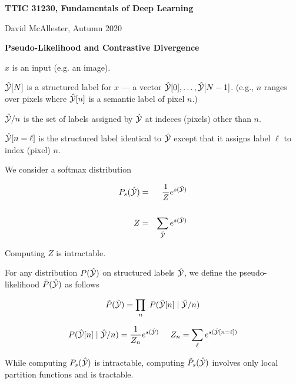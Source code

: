 




{\Huge

  \centerline{\bf TTIC 31230, Fundamentals of Deep Learning}
  \bigskip
  \centerline{David McAllester, Autumn 2020}
  \vfill
  \vfill
  \centerline{\bf Pseudo-Likelihood and Contrastive Divergence}
\vfill
\vfill
\vfill


$x$ is an input (e.g. an image).

\vfill
$\hat{\cal Y} [N]$ is a structured label for $x$ --- a vector $\hat{\cal Y}[0],\ldots,\hat{\cal Y}[N-1]$. (e.g., $n$ ranges over pixels where $\hat{\cal Y}[n]$ is a semantic label of pixel $n$.)

\vfill
$\hat{\cal Y}/n$ is the set of labels assigned by $\hat{\cal Y}$ at indeces (pixels) other than $n$.

\vfill
$\hat{\cal Y}[n=\ell]$ is the structured label identical to $\hat{\cal Y}$ except that it assigns label $\ell$ to index (pixel) $n$.


\vfill
We consider a softmax distribution

\vfill
\begin{eqnarray*}
P_s(\hat{\cal Y}) & = & \frac{1}{Z}e^{s(\hat{\cal Y})} \\
\\
Z & = & \sum_{\hat{\cal Y}} e^{s(\hat{\cal Y})}
\end{eqnarray*}

\vfill
Computing $Z$ is intractable.


For any distribution $P(\hat{\cal Y})$ on structured labels $\hat{\cal Y}$,
we define the {\color{red} pseudo-likelihood}  $\tilde{P}(\hat{\cal Y})$ as follows

{\color{red} $$\tilde{P}(\hat{\cal Y}) = \prod_n\;P(\hat{\cal Y}[n]\;|\; \hat{\cal Y}/n)$$}

\vfill
$$P(\hat{\cal Y}[n]\;|\;\hat{\cal Y}/n) = \frac{1}{Z_n}e^{s(\hat{\cal Y})}\;\;\;\;\;Z_n = \sum_{\ell} e^{s(\hat{\cal Y}[n=\ell])}$$

\vfill
While computing $P_s(\hat{\cal Y})$ is intractable, computing $\tilde{P}_s(\hat{\cal Y})$ involves only local partition functions and is tractable.


}
